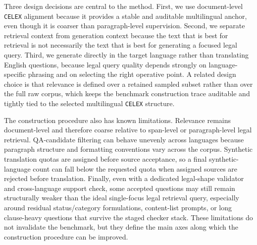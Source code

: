Three design decisions are central to the method. First, we use document-level \texttt{CELEX} alignment because it provides a stable and auditable multilingual anchor, even though it is coarser than paragraph-level supervision. Second, we separate retrieval context from generation context because the text that is best for retrieval is not necessarily the text that is best for generating a focused legal query. Third, we generate directly in the target language rather than translating English questions, because legal query quality depends strongly on language-specific phrasing and on selecting the right operative point. A related design choice is that relevance is defined over a retained sampled subset rather than over the full raw corpus, which keeps the benchmark construction trace auditable and tightly tied to the selected multilingual \texttt{CELEX} structure.

The construction procedure also has known limitations. Relevance remains document-level and therefore coarse relative to span-level or paragraph-level legal retrieval. QA-candidate filtering can behave unevenly across languages because paragraph structure and formatting conventions vary across the corpus. Synthetic translation quotas are assigned before source acceptance, so a final synthetic-language count can fall below the requested quota when assigned sources are rejected before translation. Finally, even with a dedicated legal-shape validator and cross-language support check, some accepted questions may still remain structurally weaker than the ideal single-focus legal retrieval query, especially around residual status/category formulations, content-list prompts, or long clause-heavy questions that survive the staged checker stack. These limitations do not invalidate the benchmark, but they define the main axes along which the construction procedure can be improved.
